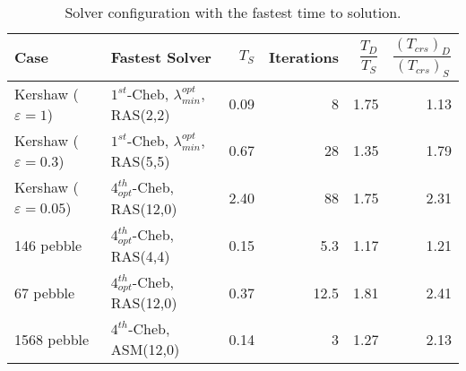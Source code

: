 \begin{table}\small
\centering
\begin{tabular}{llrrrr}
\toprule
             Case            &                                     Fastest Solver                 & $T_S$          &  Iterations &  $\dfrac{T_D}{T_S}$ & $\dfrac{\left(T_{crs}\right)_D}{\left(T_{crs}\right)_S}$\\
\midrule
Kershaw ($\varepsilon=1   $) & $1^{st}$-Cheb, $\lambda_{min}^{opt}$, RAS(2,2) &           0.09 &        8 &     1.75                & 1.13     \\
Kershaw ($\varepsilon=0.3 $) & $1^{st}$-Cheb, $\lambda_{min}^{opt}$, RAS(5,5) &           0.67 &       28 &     1.35                & 1.79     \\
Kershaw ($\varepsilon=0.05$) &        $4^{th}_{opt}$-Cheb, RAS(12,0)          &           2.40 &       88 &     1.75         & 2.31     \\
\hline
146 pebble                        &         $4^{th}_{opt}$-Cheb, RAS(4,4)     &           0.15 &        5.3 &     1.17         & 1.21  \\
67 pebble                         &        $4^{th}_{opt}$-Cheb, RAS(12,0)     &           0.37 &       12.5 &     1.81  & 2.41  \\
1568 pebble                       &            $4^{th}$-Cheb, ASM(12,0)       &           0.14 &        3 &     1.27    & 2.13  \\
\bottomrule
\end{tabular}
\caption{\small \label{tab:fastest_solver_nekrs}Solver configuration with the fastest time to solution.
}
\end{table}
